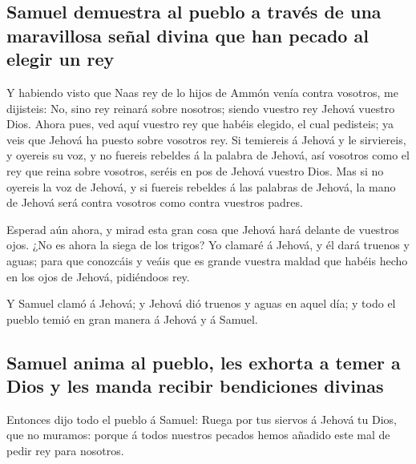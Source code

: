 \hypertarget{samuel-demuestra-al-pueblo-a-travuxe9s-de-una-maravillosa-seuxf1al-divina-que-han-pecado-al-elegir-un-rey}{%
\subsection{Samuel demuestra al pueblo a través de una maravillosa señal
divina que han pecado al elegir un
rey}\label{samuel-demuestra-al-pueblo-a-travuxe9s-de-una-maravillosa-seuxf1al-divina-que-han-pecado-al-elegir-un-rey}}

 Y habiendo visto que Naas rey de lo hijos de Ammón venía
contra vosotros, me dijisteis: No, sino rey reinará sobre nosotros;
siendo vuestro rey Jehová vuestro Dios.  Ahora pues, ved
aquí vuestro rey que habéis elegido, el cual pedisteis; ya veis que
Jehová ha puesto sobre vosotros rey.  Si temiereis á
Jehová y le sirviereis, y oyereis su voz, y no fuereis rebeldes á la
palabra de Jehová, así vosotros como el rey que reina sobre vosotros,
seréis en pos de Jehová vuestro Dios.  Mas si no oyereis
la voz de Jehová, y si fuereis rebeldes á las palabras de Jehová, la
mano de Jehová será contra vosotros como contra vuestros padres.

 Esperad aún ahora, y mirad esta gran cosa que Jehová
hará delante de vuestros ojos.  ¿No es ahora la siega de
los trigos? Yo clamaré á Jehová, y él dará truenos y aguas; para que
conozcáis y veáis que es grande vuestra maldad que habéis hecho en los
ojos de Jehová, pidiéndoos rey.

 Y Samuel clamó á Jehová; y Jehová dió truenos y aguas en
aquel día; y todo el pueblo temió en gran manera á Jehová y á Samuel.

\hypertarget{samuel-anima-al-pueblo-les-exhorta-a-temer-a-dios-y-les-manda-recibir-bendiciones-divinas}{%
\subsection{Samuel anima al pueblo, les exhorta a temer a Dios y les
manda recibir bendiciones
divinas}\label{samuel-anima-al-pueblo-les-exhorta-a-temer-a-dios-y-les-manda-recibir-bendiciones-divinas}}

 Entonces dijo todo el pueblo á Samuel: Ruega por tus
siervos á Jehová tu Dios, que no muramos: porque á todos nuestros
pecados hemos añadido este mal de pedir rey para nosotros.

